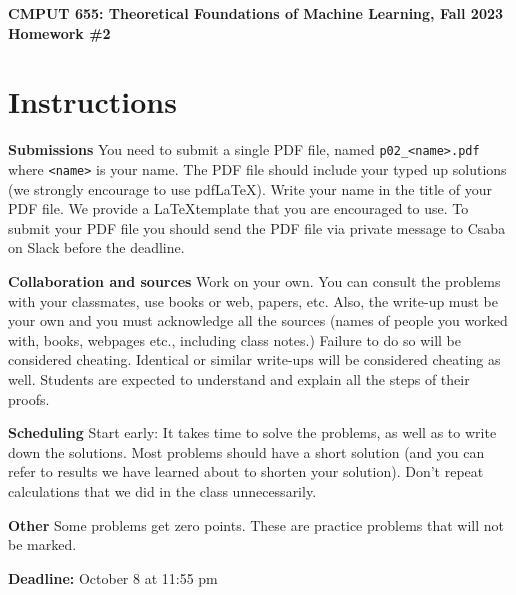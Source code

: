 \documentclass{article}
\newcommand{\hwnumber}{2}
\DeclareMathOperator*{\1}{\mathbbm{1}}
\theoremstyle{definition}
\theoremstyle{remark}
\begin{document}
\begin{center}
{\Large \textbf{CMPUT 655: Theoretical Foundations of Machine Learning, Fall 2023\\ Homework \#\hwnumber}}
\end{center}

\section*{Instructions}
\textbf{Submissions}
You need to submit a single PDF file, named {\tt p0\hwnumber\_<name>.pdf} where {\tt <name>} is your name.
The PDF file should include your typed up solutions (we strongly encourage to use pdf\LaTeX). 
Write your name in the title of your PDF file.
We provide a \LaTeX template that you are encouraged to use.
To submit your PDF file you should send the PDF file via private message to Csaba on Slack before the deadline.


\textbf{Collaboration and sources}
Work on your own. You can consult the problems with your classmates, use books
or web, papers, etc.
Also, the write-up must be your own and you must acknowledge all the
sources (names of people you worked with, books, webpages etc., including class notes.) 
Failure to do so will be considered cheating.  
Identical or similar write-ups will be considered cheating as well.
Students are expected to understand and explain all the steps of their proofs.

\textbf{Scheduling}
Start early: It takes time to solve the problems, as well as to write down the solutions. Most problems should have a short solution (and you can refer to results we have learned about to shorten your solution). Don't repeat calculations that we did in the class unnecessarily.

\textbf{Other}
Some problems get zero points. These are practice problems that will not be marked.

\vspace{0.3cm}

\textbf{Deadline:} October 8 at 11:55 pm

\newcommand{\cM}{\mathcal{M}}
\newcommand{\nS}{\mathrm{S}}
\newcommand{\nA}{\mathrm{A}}
\newcommand{\PP}{\mathbb{P}}
\newcommand{\RR}{\mathbb{R}}
\newcommand{\cX}{\mathcal{X}}
\newcommand{\cE}{\mathcal{E}}
\newcommand{\cY}{\mathcal{Y}}
\newcommand{\cZ}{\mathcal{Z}}
\newcommand{\cG}{\mathcal{G}}
\newcommand{\cD}{\mathcal{D}}
\newcommand{\cN}{\mathcal{N}}
\newcommand{\ip}[1]{\langle #1 \rangle}
\newcommand{\one}[1]{\mathbb{I}\{#1\}}
\newcommand{\KL}{\mathrm{KL}}
\end{document}
